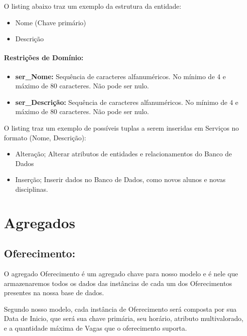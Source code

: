 \documentclass{report}
\begin{document}
	O listing abaixo traz um exemplo da estrutura da entidade:
\begin{itemize}
  \item Nome (Chave primário)
  \item Descrição
\end{itemize}
\paragraph{Restrições de Domínio:}
\begin{itemize}
  \item \textbf{ser\_Nome:} Sequência de caracteres alfanuméricos. No mínimo de 4 e máximo de 80 caracteres. Não pode ser nulo.
    \item \textbf{ser\_Descrição:} Sequência de caracteres alfanuméricos. No mínimo de 4 e máximo de 80 caracteres. Não pode ser nulo.
\end{itemize}
O listing traz um exemplo de possíveis tuplas a serem inseridas em Serviços no formato (Nome, Descrição):

\begin{itemize}
	\item Alteração; Alterar atributos de entidades e relacionamentos do Banco de Dados
	\item Inserção; Inserir dados no Banco de Dados, como novos alunos e novas disciplinas.
\end{itemize}
\section{Agregados}
\subsection{Oferecimento:}
 O agregado Oferecimento é um agregado chave para nosso modelo e é nele que armazenaremos todos os dados das instâncias de cada um dos Oferecimentos presentes na nossa base de dados.
	
	Segundo nosso modelo, cada instância de Oferecimento será composta por sua Data de Inicio, que será sua chave primária, seu horário, atributo multivalorado, e a quantidade máxima de Vagas que o oferecimento suporta.
			
\end{document}
